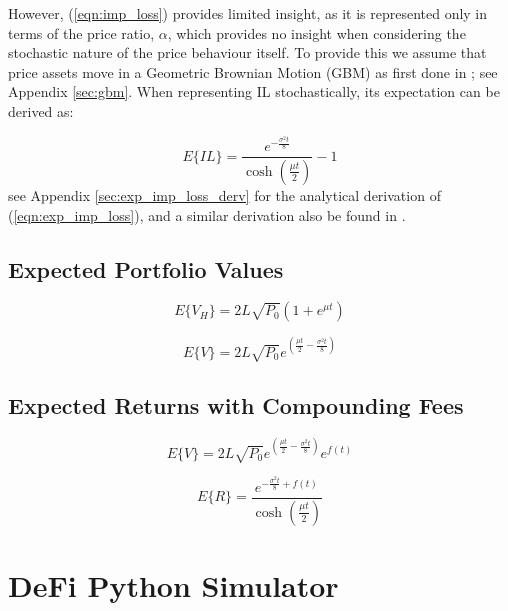 \documentclass[journal,twocolumn,12pt]{ieeesyscoin}
\begin{document}
However, (\ref{eqn:imp_loss}) provides limited insight, as it is represented only in terms of the price ratio, $\alpha$, which provides no insight when considering the stochastic nature of the price behaviour itself. To provide this we assume that price assets move in a Geometric Brownian Motion (GBM) as first done in \cite{Gui21}; see Appendix \ref{sec:gbm}. When representing IL stochastically, its expectation can be derived as:

\begin{equation}\label{eqn:exp_imp_loss}
  E\{IL\} = \frac{e^{-\frac{\sigma^2 t}{8}}}{\cosh (\frac{\mu t}{2})} - 1
\end{equation}
see Appendix \ref{sec:exp_imp_loss_derv} for the analytical derivation of (\ref{eqn:exp_imp_loss}), and a similar derivation also be found in \cite{Dan22}.

\subsection{Expected Portfolio Values}
\label{sec:exp_portfolio_value}

\lipsum[1]

\begin{equation}\label{eqn:held_portfolio}
  E\{V_{H}\} = 2 L \sqrt{P_{0}} (1 + e^{\mu t})
\end{equation}

\begin{equation}\label{eqn:portfolio_outside}
  E\{V\} = 2 L \sqrt{P_{0}}  e^{(\frac{\mu t}{2} - \frac{\sigma^2 t}{8})}
\end{equation}

\subsection{Expected Returns with Compounding Fees}
\label{sec:exp_lp_returns}

\lipsum[1]

\begin{equation}\label{eqn:portfolio_outside}
  E\{V\} = 2 L \sqrt{P_{0}}  e^{(\frac{\mu t}{2} - \frac{\sigma^2 t}{8})}e^{f(t)}
\end{equation}

\begin{equation}\label{eqn:exp_returns}
  E\{R\} = \frac{e^{-\frac{\sigma^2 t}{8} + f(t)}}{\cosh (\frac{\mu t}{2})}
\end{equation}

\section{DeFi Python Simulator}
\label{sec:python_simulator}
\end{document}
